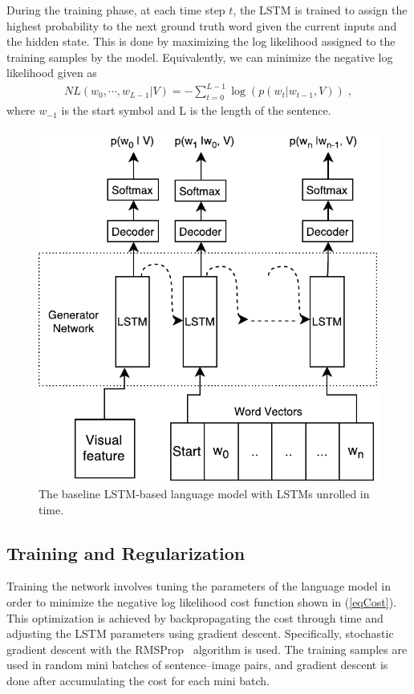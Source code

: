 During the training phase, at each time step $t$, the LSTM is trained to assign
the highest probability to the next ground truth word given the current inputs
and the hidden state.
This is done by maximizing the log likelihood assigned to the training samples
by the model.
Equivalently, we can minimize the negative log likelihood given as
\begin{align}
  \label{eqCost}
  NL(w_0,\cdots, w_{L-1} | V) = -\sum_{t=0}^{L-1} \log(p(w_t|w_{t-1},V)) \; ,
\end{align}
\noindent where $w_{-1}$ is the start symbol and L is the length of the sentence.
\begin{figure}[h]
\begin{center}
   \includegraphics[width=0.5\linewidth]{images/Thesis_lstmLangGen.pdf}
\end{center}
\vspace*{-4mm}
\caption{The baseline LSTM-based language model with LSTMs unrolled in time.}
\label{fig:baselinelstmlang}
\end{figure}

\subsection{Training and Regularization}
Training the network involves tuning the parameters of the language model in
order to minimize the negative log likelihood cost function shown in
(\ref{eqCost}).
This optimization is achieved by backpropagating the cost through time and
adjusting the LSTM parameters using gradient descent.
Specifically, stochastic gradient descent with the RMSProp~\cite{rmspropTielman}
algorithm is used.
The training samples are used in random mini batches of sentence--image pairs,
and gradient descent is done after accumulating the cost for each mini batch.

